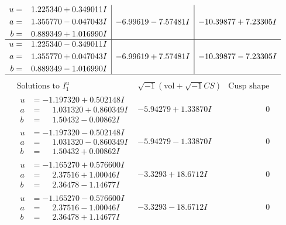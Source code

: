 \documentclass[1p]{elsarticle_modified}
\theoremstyle{definition}
\newcommand{\I}{\sqrt{-1}}
\begin{document}
$$\begin{array}{c|c|c}
\begin{aligned}
u &= \phantom{-}1.225340 + 0.349011 I \\
a &= \phantom{-}1.355770 - 0.047043 I \\
b &= \phantom{-}0.889349 + 1.016990 I\end{aligned}
 & -6.99619 - 7.57481 I & -10.39877 + 7.23305 I \\ \hline\begin{aligned}
u &= \phantom{-}1.225340 - 0.349011 I \\
a &= \phantom{-}1.355770 + 0.047043 I \\
b &= \phantom{-}0.889349 - 1.016990 I\end{aligned}
 & -6.99619 + 7.57481 I & -10.39877 - 7.23305 I\\
 \hline 
 \end{array}$$\newpage$$\begin{array}{c|c|c}  
\text{Solutions to }I^u_{1}& \I (\text{vol} + \sqrt{-1}CS) & \text{Cusp shape}\\
 \hline 
\begin{aligned}
u &= -1.197320 + 0.502148 I \\
a &= \phantom{-}1.031320 + 0.860349 I \\
b &= \phantom{-}1.50432 - 0.00862 I\end{aligned}
 & -5.94279 + 1.33870 I & \phantom{-0.000000 } 0 \\ \hline\begin{aligned}
u &= -1.197320 - 0.502148 I \\
a &= \phantom{-}1.031320 - 0.860349 I \\
b &= \phantom{-}1.50432 + 0.00862 I\end{aligned}
 & -5.94279 - 1.33870 I & \phantom{-0.000000 } 0 \\ \hline\begin{aligned}
u &= -1.165270 + 0.576600 I \\
a &= \phantom{-}2.37516 + 1.00046 I \\
b &= \phantom{-}2.36478 - 1.14677 I\end{aligned}
 & -3.3293 + 18.6712 I & \phantom{-0.000000 } 0 \\ \hline\begin{aligned}
u &= -1.165270 - 0.576600 I \\
a &= \phantom{-}2.37516 - 1.00046 I \\
b &= \phantom{-}2.36478 + 1.14677 I\end{aligned}
 & -3.3293 - 18.6712 I & \phantom{-0.000000 } 0 \\ \hline\begin{aligned}

\end{aligned}
\end{array}$$
\end{document}
